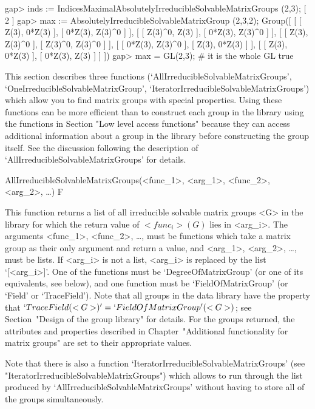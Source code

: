 \beginexample
gap> inds := IndicesMaximalAbsolutelyIrreducibleSolvableMatrixGroups (2,3);
[ 2 ] 
gap> max := AbsolutelyIrreducibleSolvableMatrixGroup (2,3,2);
Group([ [ [ Z(3), 0*Z(3) ], [ 0*Z(3), Z(3)^0 ] ], [ [ Z(3)^0, Z(3) ], [ 0*Z(3), Z(3)^0 ] ], 
  [ [ Z(3), Z(3)^0 ], [ Z(3)^0, Z(3)^0 ] ], [ [ 0*Z(3), Z(3)^0 ], [ Z(3), 0*Z(3) ] ], 
  [ [ Z(3), 0*Z(3) ], [ 0*Z(3), Z(3) ] ] ])
gap> max = GL(2,3); # it is the whole GL
true
\endexample



This section describes three functions
(`AllIrreducibleSolvableMatrixGroups',
`OneIrreducibleSolvableMatrixGroup',
`IteratorIrreducibleSolvableMatrixGroups') which allow you to find matrix
groups with special properties. Using these functions can be more efficient
than to construct each group in the library using the functions in Section
"Low level access functions" because they can access additional information 
about a group in the {\IRREDSOL} library before constructing the group itself. 
See the discussion following the description of 
`AllIrreducibleSolvableMatrixGroups' for details. 

\>AllIrreducibleSolvableMatrixGroups(<func_1>, <arg_1>, <func_2>, <arg_2>, \dots) F

This function returns a list of all irreducible solvable matrix
groups <G> in the {\IRREDSOL} library for which the return value of $<func_i>(G)$ lies in
<arg_i>.  The arguments <func_1>, <func_2>, \dots,
must be {\GAP} functions which take a matrix group as their only argument and
return a value, and <arg_1>, <arg_2>,
\dots,  must be lists. If <arg_i> is not a list, <arg_i> is replaced by the list
`[<arg_i>]'. One of the functions must be `DegreeOfMatrixGroup' (or one of its
equivalents, see below), and one function must be  `FieldOfMatrixGroup' (or `Field' or 
`TraceField'). Note that all groups in the data library have the property that 
$`TraceField(<G>)' = `FieldOfMatrixGroup'(<G>)$; see Section~"Design of the group library" 
for details. 
For the groups returned, the attributes and properties described in 
Chapter~"Additional functionality for matrix groups" are set to their appropriate values.


Note that there is also a function `IteratorIrreducibleSolvableMatrixGroups' (see
"IteratorIrreducibleSolvableMatrixGroups") which allows to run through the list produced by
`AllIrreducibleSolvableMatrixGroups' without having to store all of the groups
simultaneously.

